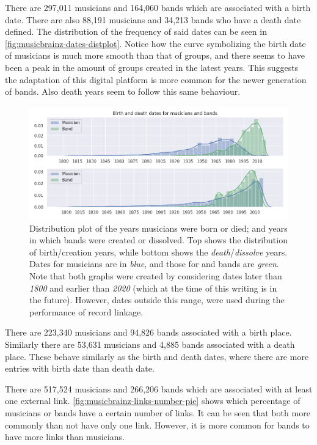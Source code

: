\documentclass[epsfig,a4paper,11pt,titlepage,twoside,openany]{book}
\begin{document}
There are 297,011 musicians and 164,060 bands which are associated with a birth date. There are also 88,191 musicians and 34,213 bands who have a death date defined. The distribution of the frequency of said dates can be seen in \autoref{fig:musicbrainz-dates-distplot}. Notice how the curve symbolizing the birth date of musicians is much more smooth than that of groups, and there seems to have been a peak in the amount of groups created in the latest years. This suggests the adaptation of this digital platform is more common for the newer generation of bands. Also death years seem to follow this same behaviour.

\begin{figure}[]
  \centering \includegraphics[width=\textwidth]{musicbrainz_birth_death_dates_distplot} 
  \caption{Distribution plot of the years musicians were born or died; and years in which bands were created or dissolved. Top shows the distribution of birth/creation years, while bottom shows the \textit{death}/\textit{dissolve} years. Dates for musicians are in \textit{blue}, and those for and bands are \textit{green}. Note that both graphs were created by considering dates later than \textit{1800} and earlier than \textit{2020} (which at the time of this writing is in the future). However, dates outside this range, were used during the performance of record linkage.}
  \label{fig:musicbrainz-dates-distplot}
\end{figure}

There are 223,340 musicians and 94,826 bands associated with a birth place. Similarly there are 53,631 musicians and 4,885 bands associated with a death place. These behave similarly as the birth and death dates, where there are more entries with birth date than death date.

There are 517,524 musicians and 266,206 bands which are associated with at least one external link. \autoref{fig:musicbrainz-links-number-pie} shows which percentage of musicians or bands have a certain number of links. It can be seen that both more commonly than not have only one link. However, it is more common for bands to have more links than musicians. 
\end{document}
